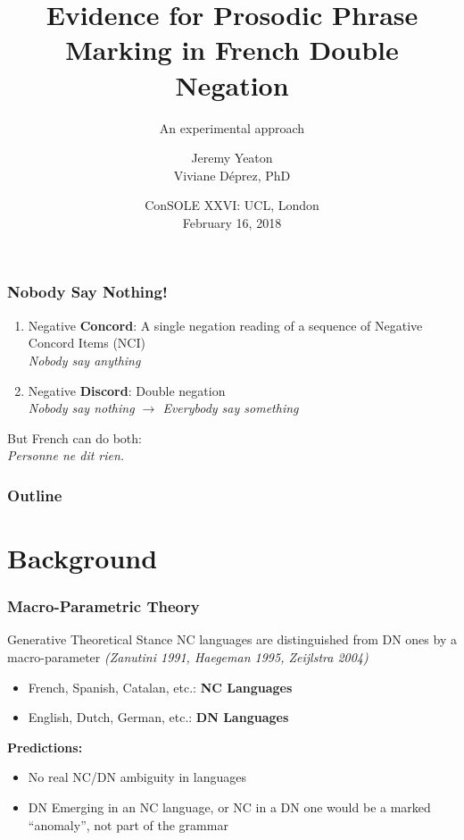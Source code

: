 \documentclass{beamer}
\title{Evidence for Prosodic Phrase Marking in French Double Negation}
\subtitle{An experimental approach}
\author{Jeremy Yeaton\\Viviane D\'eprez, PhD}
\institute{\'Ecole normale sup\'erieure de Paris\\Rutgers University}
\date{ConSOLE XXVI: UCL, London\\ February 16, 2018}
\begin{document}
\begin{frame}
\titlepage
\end{frame}

\begin{frame}
\frametitle{Nobody Say Nothing!}
\begin{enumerate}
\item Negative \textbf{Concord}: A single negation reading of a sequence of Negative Concord Items (NCI)\\ \textit{Nobody say anything }\\
\item Negative \textbf{Discord}: Double negation \\ 
\textit{Nobody say nothing $\rightarrow$ Everybody say something}
\end{enumerate}
\bigskip
But French can do both:\\
\textit{Personne ne dit rien.}
\end{frame}

\begin{frame}
\label{contents}
\frametitle{Outline}
\tableofcontents
\end{frame}

\section{Background}
\begin{frame}
\frametitle{Macro-Parametric Theory}
\begin{block}{Generative Theoretical Stance}
NC languages are distinguished from DN ones by a macro-parameter \textit{(Zanutini 1991, Haegeman 1995, Zeijlstra 2004)}
\begin{itemize}
\item French, Spanish, Catalan, etc.: \textbf{NC Languages}
\item English, Dutch, German, etc.: \textbf{DN Languages}
\end{itemize}
\textbf{Predictions:} 
\begin{itemize}
\item No real NC/DN ambiguity in languages
\item DN Emerging in an NC language, or NC in a DN one would be a marked ``anomaly'', not part of the grammar
\end{itemize}
\end{block}
\end{frame}
\end{document}
